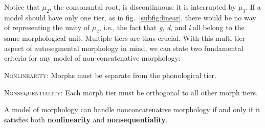 Notice that $\mu_2$, the consonantal root, is discontinuous; it is
interrupted by $\mu_3$. If a model should have only one tier, as in
fig.~\ref{subfig:linear}, there would be no way of representing the
unity of $\mu_2$, i.e., the fact that \textit{g}, \textit{d}, and \textit{l}
all belong to the same morphological unit. Multiple tiers are thus crucial. With this multi-tier aspect of
autosegmental morphology in mind, we can state two fundamental criteria for any
model of non-concatenative morphology:

	\begin{definition}\label{def:nl}{\textsc{Nonlinearity}}: %
	Morphs must be separate from the phonological tier. \end{definition}
	\begin{definition}\label{def:ns}{\textsc{Nonsequentiality}}: %
	Each morph tier must be orthogonal to all other morph tiers.
	\end{definition}
\begin{proposition}\label{prop:nlns}
A model of morphology can handle nonconcatenative morphology if and only if it satisfies both \textbf{nonlinearity} and \textbf{nonsequentiality}. %
\end{proposition}

